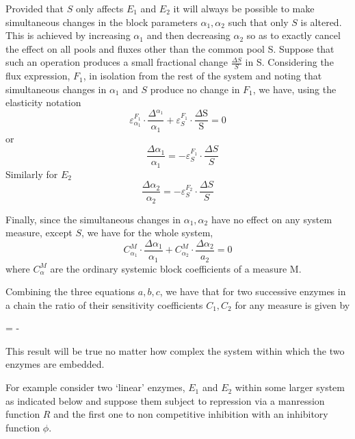 Provided that $S$ only affects $E_{1}$ and $E_{2}$ it will always be possible to make simultaneous changes in the block parameters $\alpha_{1}, \alpha_{2}$ such that only $S$ is altered. This is achieved by increasing $\alpha_{1}$ and then decreasing $\alpha_{2}$ so as to exactly cancel the effect on all pools and fluxes other than the common pool S. Suppose that such an operation produces a small fractional change $\frac{\Delta S}{S}$ in S. Considering the flux expression, $F_{1}$, in isolation from the rest of the system and noting that simultaneous changes in $\alpha_{1}$ and $S$ produce no change in $F_{1}$, we have, using the elasticity notation
%
$$
\varepsilon_{\alpha_{1}}^{F_{1}} \cdot \frac{\Delta{ }^{\alpha_1}}{\alpha_1} + \varepsilon_S^{F_1} \cdot \frac{\Delta \mathrm{S}}{\mathrm{S}}=0
$$
%
or
%
\begin{equation}
\quad \frac{\Delta \alpha_{1}}{\alpha_{1}} = -\varepsilon_{S}^{F_1} \cdot \frac{\Delta S}{S} \tag{a}
\label{eqn:323a}
\end{equation}
%
Similarly for $E_2$
\begin{equation}
\frac{\Delta \alpha_2}{\alpha_2}=-\varepsilon_S^{F_2} \cdot \frac{\Delta S}{S} \tag{b}
\label{eqn:323b}
\end{equation}

Finally, since the simultaneous changes in $\alpha_{1}, \alpha_{2}$ have no effect on any system measure, except $S$, we have for the whole system,
%
\begin{equation}
C_{\alpha_{1}}^{M} \cdot \frac{\Delta \alpha_{1}}{\alpha_{1}}+C_{\alpha_{2}}^{M} \cdot \frac{\Delta \alpha_{2}}{a_{2}}=0 \tag{c}
\label{eqn:323c}
\end{equation}
%
where $C_{\alpha}^{M}$ are the ordinary systemic block coefficients of a measure M.

Combining the three equations $a, b, c$, we have that for two successive enzymes in a chain the ratio of their sensitivity coefficients $C_{1}, C_{2}$ for any measure is given by

\begin{tcolorbox}
 = -
\label{eqn:324}
\end{tcolorbox}

This result will be true no matter how complex the system within which the two enzymes are embedded.

For example consider two `linear' enzymes, $E_{1}$ and $E_{2}$ within some larger system as indicated below and suppose them subject to repression via a manression function $R$ and the first one to non competitive inhibition with an inhibitory function $\phi$.

